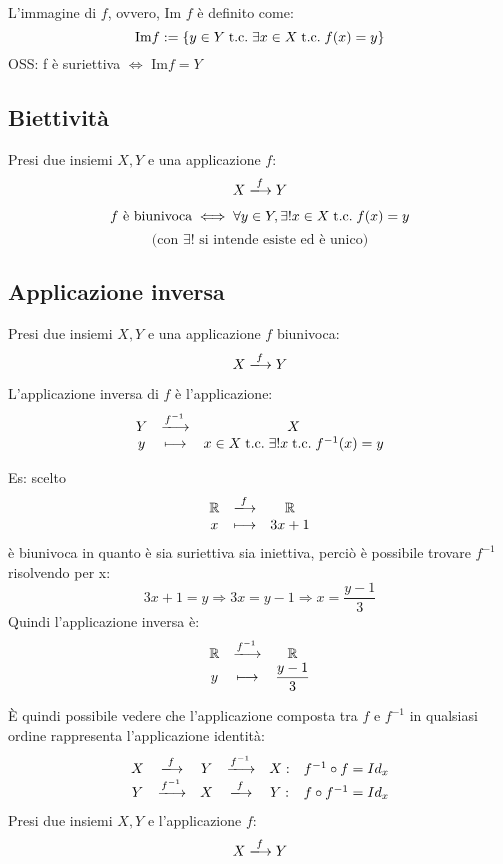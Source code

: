\documentclass[a4paper,12pt]{article}
\begin{document}
	L'immagine di $f$, ovvero, Im $f$ è definito come: 
	\[
	\text{Im} f:= \{y \in Y \;\text{t.c.}\; \exists x\in X \;\text{t.c.}\; f(x) = y\}
	\]
	OSS: f è suriettiva $\iff$ Im$f = Y$
	\subsection{Biettività}
	Presi due insiemi $X, Y$ e una applicazione $f$:
	\[
	X \xlongrightarrow{f} Y
	\] 
	
	\[f \text{ è biunivoca} \iff \forall y \in Y, \exists! x \in X \;\text{t.c.}\; f(x) = y \]
	\[\text{(con } \exists! \text{ si intende esiste ed è unico})\]
	
	
	\subsection{Applicazione inversa}
	Presi due insiemi $X, Y$ e una applicazione $f$ biunivoca:
	\[
	X \xlongrightarrow{f} Y
	\] 
	
	L'applicazione inversa di $f$ è l'applicazione:
	\[
	\begin{array}{c c c}
		Y & \xlongrightarrow{f^{-1}} & X \\
		y & \longmapsto & x \in X \tc \exists ! x \tc f^{-1}(x) = y
	\end{array}
	\]
	
	Es:
	scelto
	\[
	\begin{array}{c c c}
		\mathbb{R} & \xlongrightarrow{f} & \mathbb{R} \\
		x & \longmapsto & 3x + 1
	\end{array}
	\]
	è biunivoca in quanto è sia suriettiva sia iniettiva, perciò è possibile trovare $f^{-1}$ risolvendo per x:
	\[
	3x + 1 = y \Longrightarrow 3x = y - 1 \Longrightarrow x = \dfrac{y -1}{3}
	\]
	Quindi l'applicazione inversa è:
	\[
	\begin{array}{c c c}
		\mathbb{R} & \xlongrightarrow{f^{-1}} & \mathbb{R} \\
		y & \longmapsto & \dfrac{y -1}{3}
	\end{array}
	\]
	
	È quindi possibile vedere che l'applicazione composta tra $f$ e $f^{-1}$ in qualsiasi ordine rappresenta l'applicazione identità:	
	\[
	\begin{array}{c c c c c c}
		X & \xlongrightarrow{f} & Y & \xlongrightarrow{f^{-1}} & X: & f^{-1} \circ f = Id_x \\
		Y & \xlongrightarrow{f^{-1}} & X & \xlongrightarrow{f} & Y: & f \circ f^{-1} = Id_x
	\end{array}
	\]\newline
	Presi due insiemi $X, Y$ e l'applicazione $f$:
	\[
	X \xlongrightarrow{f} Y
 	\]
 	
\end{document}
